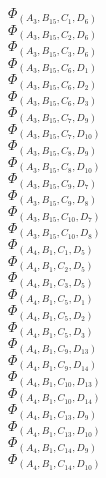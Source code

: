 \documentclass[14pt]{article}
\begin{document}
    $\Phi_{({A}_{3}, {B}_{15}, {C}_{1}, {D}_{6})}$ \\ 
    $\Phi_{({A}_{3}, {B}_{15}, {C}_{2}, {D}_{6})}$ \\ 
    $\Phi_{({A}_{3}, {B}_{15}, {C}_{3}, {D}_{6})}$ \\ 
    $\Phi_{({A}_{3}, {B}_{15}, {C}_{6}, {D}_{1})}$ \\ 
    $\Phi_{({A}_{3}, {B}_{15}, {C}_{6}, {D}_{2})}$ \\ 
    $\Phi_{({A}_{3}, {B}_{15}, {C}_{6}, {D}_{3})}$ \\ 
    $\Phi_{({A}_{3}, {B}_{15}, {C}_{7}, {D}_{9})}$ \\ 
    $\Phi_{({A}_{3}, {B}_{15}, {C}_{7}, {D}_{10})}$ \\ 
    $\Phi_{({A}_{3}, {B}_{15}, {C}_{8}, {D}_{9})}$ \\ 
    $\Phi_{({A}_{3}, {B}_{15}, {C}_{8}, {D}_{10})}$ \\ 
    $\Phi_{({A}_{3}, {B}_{15}, {C}_{9}, {D}_{7})}$ \\ 
    $\Phi_{({A}_{3}, {B}_{15}, {C}_{9}, {D}_{8})}$ \\ 
    $\Phi_{({A}_{3}, {B}_{15}, {C}_{10}, {D}_{7})}$ \\ 
    $\Phi_{({A}_{3}, {B}_{15}, {C}_{10}, {D}_{8})}$ \\ 
    $\Phi_{({A}_{4}, {B}_{1}, {C}_{1}, {D}_{5})}$ \\ 
    $\Phi_{({A}_{4}, {B}_{1}, {C}_{2}, {D}_{5})}$ \\ 
    $\Phi_{({A}_{4}, {B}_{1}, {C}_{3}, {D}_{5})}$ \\ 
    $\Phi_{({A}_{4}, {B}_{1}, {C}_{5}, {D}_{1})}$ \\ 
    $\Phi_{({A}_{4}, {B}_{1}, {C}_{5}, {D}_{2})}$ \\ 
    $\Phi_{({A}_{4}, {B}_{1}, {C}_{5}, {D}_{3})}$ \\ 
    $\Phi_{({A}_{4}, {B}_{1}, {C}_{9}, {D}_{13})}$ \\ 
    $\Phi_{({A}_{4}, {B}_{1}, {C}_{9}, {D}_{14})}$ \\ 
    $\Phi_{({A}_{4}, {B}_{1}, {C}_{10}, {D}_{13})}$ \\ 
    $\Phi_{({A}_{4}, {B}_{1}, {C}_{10}, {D}_{14})}$ \\ 
    $\Phi_{({A}_{4}, {B}_{1}, {C}_{13}, {D}_{9})}$ \\ 
    $\Phi_{({A}_{4}, {B}_{1}, {C}_{13}, {D}_{10})}$ \\ 
    $\Phi_{({A}_{4}, {B}_{1}, {C}_{14}, {D}_{9})}$ \\ 
    $\Phi_{({A}_{4}, {B}_{1}, {C}_{14}, {D}_{10})}$ \\ 
\end{document}

